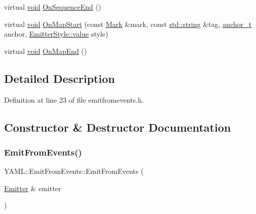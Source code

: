 \begin{DoxyCompactItemize}
\item 
virtual \mbox{\hyperlink{glad_8h_a950fc91edb4504f62f1c577bf4727c29}{void}} \mbox{\hyperlink{class_y_a_m_l_1_1_emit_from_events_ae0d600dcf74515d5cf951c3c68035ff6}{On\+Sequence\+End}} ()
\item 
virtual \mbox{\hyperlink{glad_8h_a950fc91edb4504f62f1c577bf4727c29}{void}} \mbox{\hyperlink{class_y_a_m_l_1_1_emit_from_events_aa303f384381eb99c97563d080efc17cb}{On\+Map\+Start}} (const \mbox{\hyperlink{struct_y_a_m_l_1_1_mark}{Mark}} \&mark, const \mbox{\hyperlink{glad_8h_ac83513893df92266f79a515488701770}{std\+::string}} \&tag, \mbox{\hyperlink{namespace_y_a_m_l_abeff1798814ae3402fc5665fdcad1de6}{anchor\+\_\+t}} anchor, \mbox{\hyperlink{struct_y_a_m_l_1_1_emitter_style_ae86640662c85ce6062a37f9636b6959f}{Emitter\+Style\+::value}} style)
\item 
virtual \mbox{\hyperlink{glad_8h_a950fc91edb4504f62f1c577bf4727c29}{void}} \mbox{\hyperlink{class_y_a_m_l_1_1_emit_from_events_ae2691daa2ec354c998d1ed25c648fd06}{On\+Map\+End}} ()
\end{DoxyCompactItemize}


\subsection{Detailed Description}


Definition at line 23 of file emitfromevents.\+h.



\subsection{Constructor \& Destructor Documentation}
\mbox{\label{class_y_a_m_l_1_1_emit_from_events_aab86fefb66d3c26ae66c9243b75a1597}} 
\subsubsection{\texorpdfstring{EmitFromEvents()}{EmitFromEvents()}}
{\footnotesize\ttfamily Y\+A\+M\+L\+::\+Emit\+From\+Events\+::\+Emit\+From\+Events (\begin{DoxyParamCaption}\item[{\mbox{\hyperlink{class_y_a_m_l_1_1_emitter}{Emitter}} \&}]{emitter }\end{DoxyParamCaption})}



